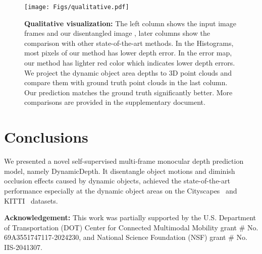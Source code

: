 \documentclass[runningheads]{llncs}
\begin{document}
\begin{figure*}[t]
\centering
\texttt{[image: Figs/qualitative.pdf]}
\caption{ \textbf{Qualitative visualization: }The left column shows the input image frames and our disentangled image , later columns show the comparison with other state-of-the-art methods. In the Histograms, most pixels of our method has lower depth error. In the error map, our method has lighter {\color{red}red} color which indicates lower depth errors. We project the dynamic object area depths to 3D point clouds and compare them with ground truth point clouds in the last column. Our prediction matches the ground truth significantly better. More comparisons are provided in the supplementary document.}
\label{fig:ql}
\end{figure*}

\section{Conclusions}
We presented a novel self-supervised multi-frame monocular depth prediction model, namely DynamicDepth. It disentangle object motions and diminish occlusion effects caused by dynamic objects, achieved the state-of-the-art performance especially at the dynamic object areas on the Cityscapes~\cite{Cityscapes} and KITTI~\cite{kitti} datasets. 

\textbf{Acknowledgement: }
This work was partially supported by the U.S. Department of Transportation (DOT) Center for Connected Multimodal Mobility grant \# No. 69A3551747117-2024230, and National Science Foundation (NSF) grant \# No. IIS-2041307.














\clearpage
\end{document}
